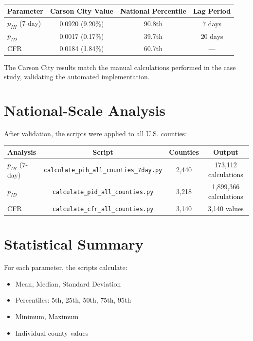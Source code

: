 \documentclass[11pt]{article}
\begin{document}
\begin{center}
\begin{tabular}{lccc}
\hline
\textbf{Parameter} & \textbf{Carson City Value} & \textbf{National Percentile} & \textbf{Lag Period} \\
\hline
$p_{IH}$ (7-day) & 0.0920 (9.20\%) & 90.8th & 7 days \\
$p_{ID}$ & 0.0017 (0.17\%) & 39.7th & 20 days \\
CFR & 0.0184 (1.84\%) & 60.7th & --- \\
\hline
\end{tabular}
\end{center}

The Carson City results match the manual calculations performed in the case study, validating the automated implementation.

\section{National-Scale Analysis}

After validation, the scripts were applied to all U.S. counties:

\begin{center}
\begin{tabular}{lccc}
\hline
\textbf{Analysis} & \textbf{Script} & \textbf{Counties} & \textbf{Output} \\
\hline
$p_{IH}$ (7-day) & \texttt{calculate\_pih\_all\_counties\_7day.py} & 2,440 & 173,112 calculations \\
$p_{ID}$ & \texttt{calculate\_pid\_all\_counties.py} & 3,218 & 1,899,366 calculations \\
CFR & \texttt{calculate\_cfr\_all\_counties.py} & 3,140 & 3,140 values \\
\hline
\end{tabular}
\end{center}

\section{Statistical Summary}

For each parameter, the scripts calculate:

\begin{itemize}
    \item Mean, Median, Standard Deviation
    \item Percentiles: 5th, 25th, 50th, 75th, 95th
    \item Minimum, Maximum
    \item Individual county values
\end{itemize}
\end{document}
